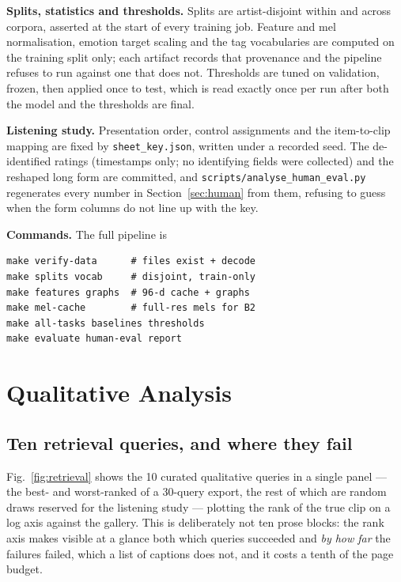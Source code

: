 \documentclass[conference]{IEEEtran}
\newcommand{\RetrievalNPool}{30}
\newcommand{\RetrievalNShown}{10}
\begin{document}
\textbf{Splits, statistics and thresholds.} Splits are artist-disjoint within
and across corpora, asserted at the start of every training job. Feature and
mel normalisation, emotion target scaling and the tag vocabularies are computed
on the training split only; each artifact records that provenance and the
pipeline refuses to run against one that does not. Thresholds are tuned on
validation, frozen, then applied once to test, which is read exactly once per
run after both the model and the thresholds are final.

\textbf{Listening study.} Presentation order, control assignments and the
item-to-clip mapping are fixed by \texttt{sheet\_key.json}, written under a
recorded seed. The de-identified ratings (timestamps only; no identifying
fields were collected) and the reshaped long form are committed, and
\texttt{scripts/analyse\_human\_eval.py} regenerates every number in
Section~\ref{sec:human} from them, refusing to guess when the form columns do
not line up with the key.

\textbf{Commands.} The full pipeline is
{\footnotesize
\begin{verbatim}
make verify-data      # files exist + decode
make splits vocab     # disjoint, train-only
make features graphs  # 96-d cache + graphs
make mel-cache        # full-res mels for B2
make all-tasks baselines thresholds
make evaluate human-eval report
\end{verbatim}
}

\section{Qualitative Analysis}
\label{app:qualitative}
\subsection{Ten retrieval queries, and where they fail}
Fig.~\ref{fig:retrieval} shows the \RetrievalNShown{} curated qualitative
queries in a single panel --- the best- and worst-ranked of a
\RetrievalNPool{}-query export, the rest of which are random draws reserved for
the listening study --- plotting the rank of the true clip on a log axis
against the gallery. This is deliberately not ten prose blocks: the rank axis
makes visible at a glance both which queries succeeded and \emph{by how far} the
failures failed, which a list of captions does not, and it costs a tenth of the
page budget.
\end{document}
